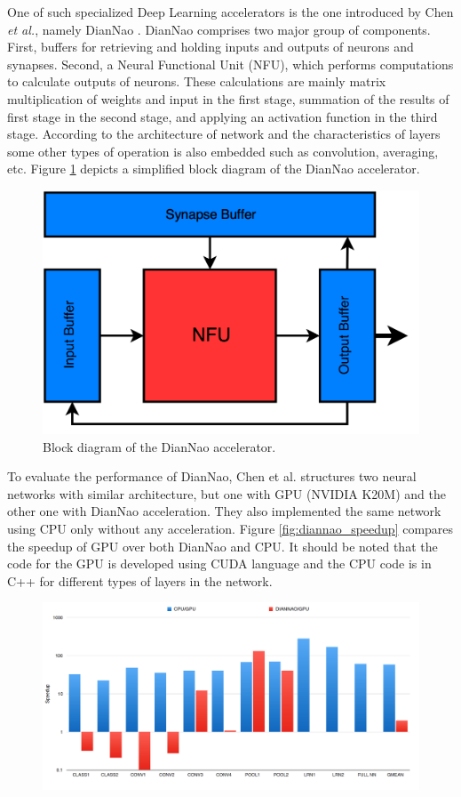 \documentclass[runningheads,a4paper]{llncs}
\begin{document}
{One of such specialized Deep Learning accelerators is the one introduced by Chen \textit{et al.}, namely DianNao \cite{chen2014diannao}. DianNao comprises two major group of components. First, buffers for retrieving and holding inputs and outputs of neurons and synapses. Second, a Neural Functional Unit (NFU), which performs computations to calculate outputs of neurons. These calculations are mainly matrix multiplication of weights and input in the first stage, summation of the results of first stage in the second stage, and applying an activation function in the third stage. According to the architecture of network and the characteristics of layers some other types of operation is also embedded such as convolution, averaging, etc. Figure \ref{fig:diannao_arch} depicts a simplified block diagram of the DianNao accelerator.
\begin{figure}[h]
	\includegraphics[scale=0.23]{./images/diannao.png}
	\centering
	\caption{Block diagram of the DianNao accelerator\cite{chen2014dadiannao}.}
	\label{fig:diannao_arch}
\end{figure}
To evaluate the performance of DianNao, Chen et al. structures two neural networks with similar architecture, but one with GPU (NVIDIA K20M) and the other one with DianNao acceleration. They also implemented the same network using CPU only without any acceleration. Figure \ref{fig:diannao_speedup} compares the speedup of GPU over both DianNao and CPU. It should be noted that the code for the GPU is developed using CUDA language and the CPU code is in C++ for different types of layers in the network.
\begin{figure}[h]
	\includegraphics[width=\textwidth]{./images/diannao_results.png}

\end{figure}}
\end{document}
